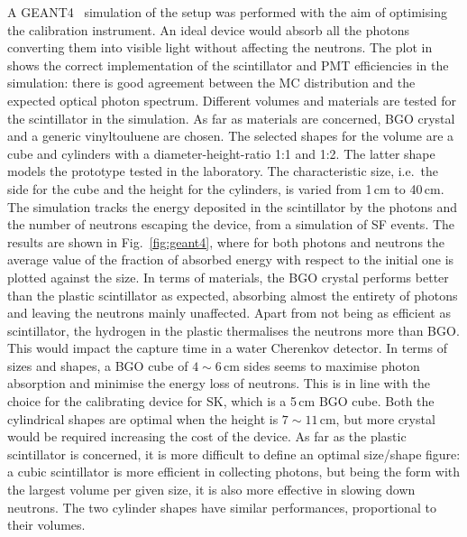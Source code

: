 A GEANT4~\cite{Agostinelli:2002hh} simulation of the setup was performed with the aim of optimising the calibration instrument.
An ideal device would absorb all the photons converting them into visible light without affecting the neutrons.
The plot in  shows the correct implementation of the scintillator and PMT efficiencies in the simulation: %
there is good agreement between the MC distribution and the expected optical photon spectrum.
Different volumes and materials are tested for the scintillator in the simulation.
As far as materials are concerned, BGO crystal and a generic vinyltouluene are chosen.
The selected shapes for the volume are a cube and cylinders with a diameter-height-ratio 1:1 and 1:2.
The latter shape models the prototype tested in the laboratory.
The characteristic size, i.e.\ the side for the cube and the height for the cylinders, is varied from 1\,cm to 40\,cm.
The simulation tracks the energy deposited in the scintillator by the photons and the number of neutrons escaping the device, %
from a simulation of  SF events.
The results are shown in Fig.~\ref{fig:geant4}, where for both photons and neutrons %
the average value of the fraction of absorbed energy with respect to the initial one is plotted against the size.
In terms of materials, the BGO crystal performs better than the plastic scintillator as expected, %
absorbing almost the entirety of photons and leaving the neutrons mainly unaffected.
Apart from not being as efficient as scintillator, the hydrogen in the plastic thermalises the neutrons more than BGO.
This would impact the capture time in a water Cherenkov detector.
In terms of sizes and shapes, a BGO cube of $4\sim6$\,cm sides seems to maximise photon absorption and minimise %
the energy loss of neutrons.
This is in line with the choice for the calibrating device for SK, which is a 5\,cm BGO cube.
Both the cylindrical shapes are optimal when the height is $7\sim11$\,cm, but more crystal would be required %
increasing the cost of the device.
As far as the plastic scintillator is concerned, it is more difficult to define an optimal size/shape figure:
a cubic scintillator is more efficient in collecting photons, but being the form with the largest volume %
per given size, it is also more effective in slowing down neutrons.
The two cylinder shapes have similar performances, proportional to their volumes.

